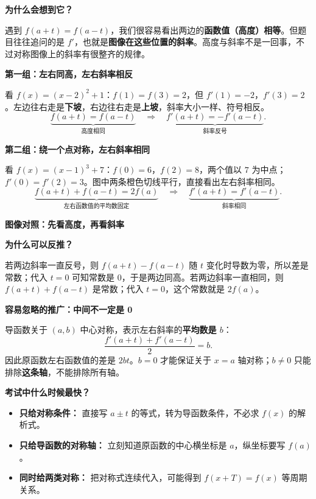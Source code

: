 \begin{explanationbox}
  \textbf{\textcolor{CExplanation}{为什么会想到它？}}\par\nopagebreak[4]

  遇到 $f(a+t)=f(a-t)$，我们很容易看出两边的\textbf{函数值（高度）相等}。但题目往往追问的是 $f'$，也就是\textbf{图像在这些位置的斜率}。高度与斜率不是一回事，不过对称图像上的斜率有很整齐的规律。

  \medskip
  \textbf{\textcolor{CExplanation}{第一组：左右同高，左右斜率相反}}\par\nopagebreak[4]

  看 $f(x)=(x-2)^2+1$：$f(1)=f(3)=2$，但 $f'(1)=-2$，$f'(3)=2$。左边往右走是\textbf{下坡}，右边往右走是\textbf{上坡}，斜率大小一样、符号相反。
  \[
    \underbrace{f(a+t)=f(a-t)}_{\text{高度相同}}
    \quad\Longrightarrow\quad
    \underbrace{f'(a+t)=-f'(a-t)}_{\text{斜率反号}}.
  \]

  \medskip
  \textbf{\textcolor{CExplanation}{第二组：绕一个点对称，左右斜率相同}}\par\nopagebreak[4]

  看 $f(x)=(x-1)^3+7$：$f(0)=6$，$f(2)=8$，两个值以 $7$ 为中点；$f'(0)=f'(2)=3$。图中两条橙色切线平行，直接看出左右斜率相同。
  \[
    \underbrace{f(a+t)+f(a-t)=2f(a)}_{\text{左右函数值的平均数固定}}
    \quad\Longrightarrow\quad
    \underbrace{f'(a+t)=f'(a-t)}_{\text{斜率相同}}.
  \]

  \medskip
  \textbf{\textcolor{CExplanation}{图像对照：先看高度，再看斜率}}
  \begin{center}
  
  \end{center}

  \medskip
  \textbf{\textcolor{CExplanation}{为什么可以反推？}}\par\nopagebreak[4]

  若两边斜率一直反号，则 $f(a+t)-f(a-t)$ 随 $t$ 变化时导数为零，所以差是常数；代入 $t=0$ 可知常数是 $0$，于是两边同高。若两边斜率一直相同，则 $f(a+t)+f(a-t)$ 是常数；代入 $t=0$，这个常数就是 $2f(a)$。

  \medskip
  \textbf{\textcolor{CExplanation}{容易忽略的推广：中间不一定是 0}}\par\nopagebreak[4]

  导函数关于 $(a,b)$ 中心对称，表示左右斜率的\textbf{平均数是 $b$}：
  \[
    \frac{f'(a+t)+f'(a-t)}{2}=b.
  \]
  因此原函数左右函数值的差是 $2bt$。$b=0$ 才能保证关于 $x=a$ 轴对称；$b\ne0$ 只能排除\textbf{这条轴}，不能排除所有轴。

  \medskip
  \textbf{\textcolor{CExplanation}{考试中什么时候最快？}}
  \begin{itemize}[leftmargin=*,itemsep=0.35em,topsep=0.3em]
    \item \textbf{只给对称条件：} 直接写 $a\pm t$ 的等式，转为导函数条件，不必求 $f(x)$ 的解析式。
    \item \textbf{只给导函数的对称轴：} 立刻知道原函数的中心横坐标是 $a$，纵坐标要写 $f(a)$。
    \item \textbf{同时给两类对称：} 把对称式连续代入，可能得到 $f(x+T)=f(x)$ 等周期关系。
  \end{itemize}
\end{explanationbox}
